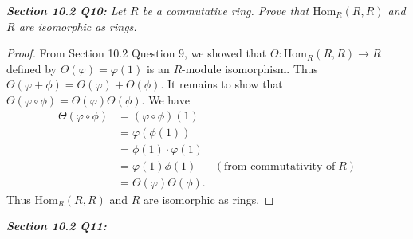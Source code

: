 \documentclass{article}
\begin{document}
\it \textbf{Section 10.2 Q10:} Let $R$ be a commutative ring. Prove that
  $\text{Hom}_R(R,R)$ and $R$ are isomorphic as rings.

  \begin{proof}
    From Section 10.2 Question 9, we showed that
    $\Theta:\text{Hom}_R(R,R)\rightarrow R$ defined by
    $\Theta(\varphi)=\varphi(1)$ is an $R$-module isomorphism. Thus
    $\Theta(\varphi+\phi)=\Theta(\varphi)+\Theta(\phi)$. It remains to show
    that $\Theta(\varphi\circ\phi)=\Theta(\varphi)\Theta(\phi)$. We have
    \begin{align*}
      \Theta(\varphi\circ\phi) &=(\varphi\circ\phi)(1) \\
      &=\varphi(\phi(1)) \\
      &=\phi(1)\cdot\varphi(1) \\
      &=\varphi(1)\phi(1) &(\text{from commutativity of}\; R) \\
      &=\Theta(\varphi)\Theta(\phi).
    \end{align*}
    Thus $\text{Hom}_R(R,R)$ and $R$ are
    isomorphic as rings.
  \end{proof}

\it \textbf{Section 10.2 Q11:}
\end{document}
